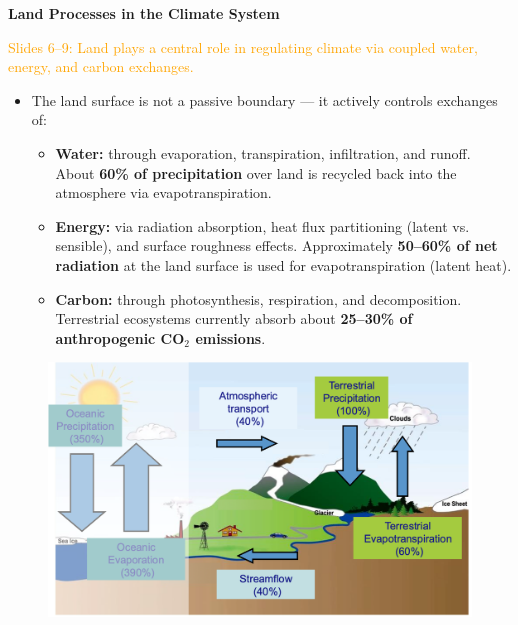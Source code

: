 \documentclass[fontsize=8pt, a4paper, landscape, fleqn]{scrartcl}
\renewcommand{\subsection}[1]{%
    \noindent\colorbox{subsectioncolor}{%
        \parbox{\dimexpr\columnwidth-2\fboxsep}{\color{white}\textbf{#1}}}%
    \vspace{0.5mm}%
}
\begin{document}
\begin{multicols*}{3}[\raggedcolumns]
\subsection{Land Processes in the Climate System}
\noindent \textcolor{orange}{Slides 6–9: Land plays a central role in regulating climate via coupled water, energy, and carbon exchanges.}

\begin{itemize}
    \item The land surface is not a passive boundary — it actively controls exchanges of:
    \begin{itemize}
        \item \textbf{Water:} through evaporation, transpiration, infiltration, and runoff. About \textbf{60\% of precipitation} over land is recycled back into the atmosphere via evapotranspiration.
        \item \textbf{Energy:} via radiation absorption, heat flux partitioning (latent vs. sensible), and surface roughness effects. Approximately \textbf{50–60\% of net radiation} at the land surface is used for evapotranspiration (latent heat).
        \item \textbf{Carbon:} through photosynthesis, respiration, and decomposition. Terrestrial ecosystems currently absorb about \textbf{25–30\% of anthropogenic CO$_2$ emissions}.
    \end{itemize}
\end{itemize}

\begin{figure}[H]
    \centering
\includegraphics[width=1\linewidth]{CS/img/global_water_cycle.png}
\end{figure}


\end{multicols*}
\end{document}
